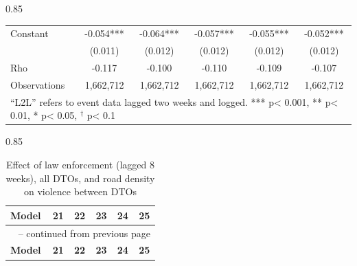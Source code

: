 \documentclass[12pt,letterpaper]{article}
\begin{document}
\begin{landscape}
\begin{center}
\begin{spacing}{0.85}
\begin{longtable}{lccccc}
Constant & -0.054*** & -0.064*** & -0.057*** & -0.055*** & -0.052*** \\
 & (0.011)  & (0.012)  & (0.012)  & (0.012)  & (0.012)  \\ \hline
            
Rho & -0.117  & -0.100  & -0.110  & -0.109  & -0.107  \\
                
Observations  & 1,662,712  & 1,662,712  & 1,662,712  & 1,662,712  & 1,662,712  \\

\hline  
\multicolumn{6}{l}{``L2L'' refers to event data lagged two weeks and logged.  *** p< 0.001, ** p< 0.01, * p< 0.05, $^{\dag}$ p< 0.1} \\
 
\end{longtable}
\end{spacing}
\end{center}






\begin{center}
\small
\begin{spacing}{0.85}
\begin{longtable}{lccccc}

\caption{Effect of law enforcement (lagged 8 weeks), all DTOs, and road density on violence between DTOs} \label{tab:enforcement_allDTOs_Road_L8L} \\

\hline 
\multicolumn{1}{l}{\textbf{Model }} &\multicolumn{1}{c}{\textbf{21}} & \multicolumn{1}{c}{\textbf{22}} & \multicolumn{1}{c}{\textbf{23}} & \multicolumn{1}{c}{\textbf{24}} & \multicolumn{1}{c}{\textbf{25}} \\ \hline 
\endfirsthead


\multicolumn{6}{c}{{\tablename\ \thetable{} -- continued from previous page}} \\ \hline
\multicolumn{1}{l}{\textbf{Model }} &\multicolumn{1}{c}{\textbf{21}} & \multicolumn{1}{c}{\textbf{22}} & \multicolumn{1}{c}{\textbf{23}} & \multicolumn{1}{c}{\textbf{24}} & \multicolumn{1}{c}{\textbf{25}} \\ \hline 
\endhead


\end{longtable}
\end{spacing}
\end{center}
\end{landscape}
\end{document}

